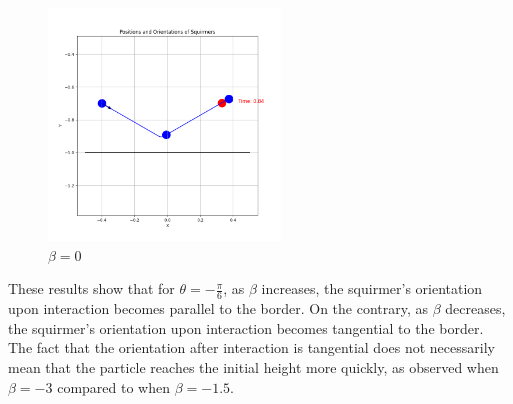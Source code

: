 \documentclass{article}
\begin{document}
\begin{figure}[H]
    \centering
    \includegraphics[width=0.55\textwidth]{graphs/simulations/border/beta0/mpi_6.png}
    \caption{\footnotesize $\beta = 0$}
\end{figure}
These results show that for $\theta = -\frac{\pi}{6}$, as $\beta$ increases, the squirmer's orientation upon interaction becomes parallel to the border.
On the contrary, as $\beta$ decreases, the squirmer's orientation upon interaction becomes tangential to the border.\\
The fact that the orientation after interaction is tangential does not necessarily mean that the particle reaches the initial 
height more quickly, as observed when $\beta = -3$ compared to when $\beta = -1.5$.
\end{document}

